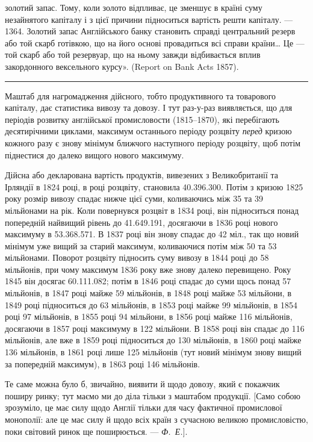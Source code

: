 \parcont{}  %
золотий запас. Тому, коли золото відпливає, це зменшує в країні суму незайнятого
капіталу і з цієї причини підноситься вартість решти капіталу. — 1364. Золотий
запас Англійського банку становить справді центральний резерв або той скарб
готівкою, що на його основі провадиться всі справи країни\dots{} Це — той скарб
або той резервуар, що на ньому завжди відбивається вплив закордонного вексельного
курсу». (Report on Bank Acts 1857).

\plainbreak{3}

Маштаб для нагромадження дійсного, тобто продуктивного та товарового
капіталу, дає статистика вивозу та довозу. І тут раз-у-раз виявляється, що
для періодів розвитку англійської промисловости (1815--1870), які перебігають
десятирічними циклами, максимум останнього періоду розцвіту \emph{перед} кризою
кожного разу є знову мінімум ближчого наступного періоду розцвіту, щоб потім
піднестися до далеко вищого нового максимуму.

Дійсна або декларована вартість продуктів, вивезених з Великобританії та
Ірляндії в 1824 році, в році розцвіту, становила \num{40.396.300}. Потім з кризою
1825 року розмір вивозу спадає нижче цієї суми, коливаючись між 35 та 39 мільйонами
на рік. Коли повернувся розцвіт в 1834 році, він підноситься понад попередній
найвищий рівень до \num{41.649.191}, досягаючи в 1836 році нового
максимуму в \num{53.368.571}. В 1837 році він знову спадає до 42 міл.,
так що новий мінімум уже вищий за старий максимум, коливаючися потім між
50 та 53 мільйонами. Поворот розцвіту підносить суму вивозу в 1844 році до
58 мільйонів, при чому максимум 1836 року вже знову далеко перевищено.
Року 1845 він досягає \num{60.111.082}; потім в 1846 році спадає до суми щось
понад 57 мільйонів, в 1847 році майже 59 мільйонів, в 1848 році майже 53 мільйони,
в 1849 році підноситься до 63 мільйонів, в 1853 році майже 99 мільйонів,
в 1854 році 97 мільйонів, в 1855 році 94 мільйони, в 1856 році майже
116 мільйонів, досягаючи в 1857 році максимуму в 122 мільйони. В 1858 році
він спадає до 116 мільйонів, але вже в 1859 році підноситься до 130 мільйонів,
в 1860 році майже 136 мільйонів, в 1861 році лише 125 мільйонів (тут
новий мінімум знову вищий за попередній максимум), в 1863 році 146 мільйонів.

Те саме можна було б, звичайно, виявити й щодо довозу, який є покажчик
поширу ринку; тут маємо ми до діла тільки з маштабом продукції. [Само
собою зрозуміло, це має силу щодо Англії тільки для часу фактичної промислової
монополії: але це має силу й щодо всіх країн з сучасною великою промисловістю,
поки світовий ринок ще поширюється. — \emph{Ф.~Е.}].

